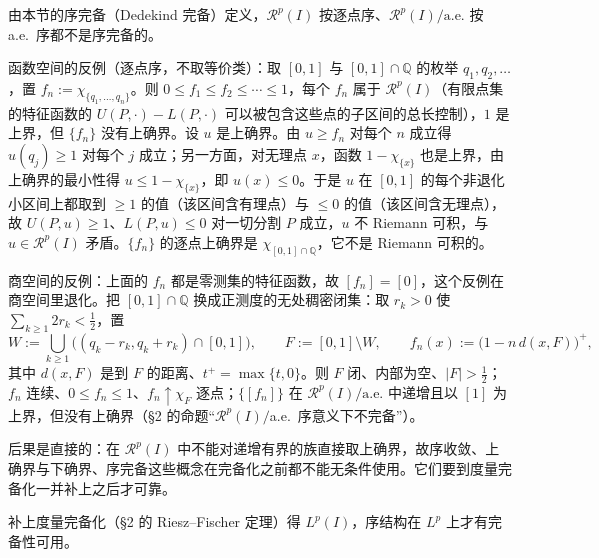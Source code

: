\documentclass[oneside]{book}
\theoremstyle{definition}
\newcommand{\Rc}{\mathcal{R}}
\providecommand{\Q}{\mathbb{Q}}
\theoremstyle{definition}
\begin{document}
	\begin{note}
		由本节的序完备（Dedekind 完备）定义，$\Rc^{p}(I)$ 按逐点序、$\Rc^{p}(I)/\mathrm{a.e.}$ 按 a.e.\ 序都不是序完备的。
		
		函数空间的反例（逐点序，不取等价类）：取 $[0,1]$ 与 $[0,1]\cap\Q$ 的枚举 $q_{1},q_{2},\dots$，置 $f_{n}:=\chi_{\{q_{1},\dots,q_{n}\}}$。则 $0\leqslant f_{1}\leqslant f_{2}\leqslant\cdots\leqslant1$，每个 $f_{n}$ 属于 $\Rc^{p}(I)$（有限点集的特征函数的 $U(P,\cdot)-L(P,\cdot)$ 可以被包含这些点的子区间的总长控制），$1$ 是上界，但 $\{f_{n}\}$ 没有上确界。设 $u$ 是上确界。由 $u\geqslant f_{n}$ 对每个 $n$ 成立得 $u(q_{j})\geqslant1$ 对每个 $j$ 成立；另一方面，对无理点 $x$，函数 $1-\chi_{\{x\}}$ 也是上界，由上确界的最小性得 $u\leqslant1-\chi_{\{x\}}$，即 $u(x)\leqslant0$。于是 $u$ 在 $[0,1]$ 的每个非退化小区间上都取到 $\geqslant1$ 的值（该区间含有理点）与 $\leqslant0$ 的值（该区间含无理点），故 $U(P,u)\geqslant1$、$L(P,u)\leqslant0$ 对一切分割 $P$ 成立，$u$ 不 Riemann 可积，与 $u\in\Rc^{p}(I)$ 矛盾。$\{f_{n}\}$ 的逐点上确界是 $\chi_{[0,1]\cap\Q}$，它不是 Riemann 可积的。
		
		商空间的反例：上面的 $f_{n}$ 都是零测集的特征函数，故 $[f_{n}]=[0]$，这个反例在商空间里退化。把 $[0,1]\cap\Q$ 换成正测度的无处稠密闭集：取 $r_{k}>0$ 使 $\sum_{k\geqslant1}2r_{k}<\tfrac12$，置
		\[
		W:=\bigcup_{k\geqslant1}\bigl((q_{k}-r_{k},q_{k}+r_{k})\cap[0,1]\bigr),\qquad
		F:=[0,1]\setminus W,\qquad
		f_{n}(x):=\bigl(1-n\,d(x,F)\bigr)^{+},
		\]
		其中 $d(x,F)$ 是到 $F$ 的距离、$t^{+}=\max\{t,0\}$。则 $F$ 闭、内部为空、$|F|>\tfrac12$；$f_{n}$ 连续、$0\leqslant f_{n}\leqslant1$、$f_{n}\uparrow\chi_{F}$ 逐点；$\{[f_{n}]\}$ 在 $\Rc^{p}(I)/\mathrm{a.e.}$ 中递增且以 $[1]$ 为上界，但没有上确界（\S 2 的命题“$\Rc^{p}(I)/$a.e.\ 序意义下不完备”）。
		
		后果是直接的：在 $\Rc^{p}(I)$ 中不能对递增有界的族直接取上确界，故序收敛、上确界与下确界、序完备这些概念在完备化之前都不能无条件使用。它们要到度量完备化一并补上之后才可靠。
	\end{note}
	
	补上度量完备化（\S 2 的 Riesz--Fischer 定理）得 $L^{p}(I)$，序结构在 $L^{p}$ 上才有完备性可用。
	
\end{document}
